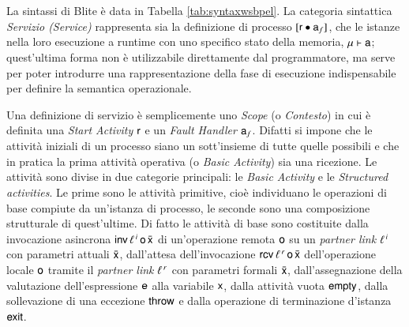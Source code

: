 La sintassi di Blite è data in Tabella \ref{tab:syntaxwsbpel}. La categoria
sintattica \emph{Servizio (Service)} rappresenta  sia la definizione di
processo $[{\sf r} \bullet {\sf a}_f]$, che le istanze nella loro esecuzione a runtime
con uno specifico stato della memoria, ${\sf \mu} \vdash {\sf a}$; quest'ultima
forma non è utilizzabile direttamente dal programmatore, ma serve per poter
introdurre una rappresentazione della fase di esecuzione indispensabile per
definire la semantica operazionale.

Una definizione di servizio è semplicemente uno \emph{Scope} (o
\emph{Contesto}) in cui è definita una
\emph{Start Activity} ${\sf r}$ e un \emph{Fault Handler} ${\sf a}_f$. Difatti si
impone che le attività iniziali di un processo siano un sott'insieme di tutte
quelle possibili e che in pratica la prima attività operativa (o \emph{Basic
Activity}) sia una ricezione. Le attività sono divise in due categorie
principali: le \emph{Basic Activity} e le \emph{Structured activities}. Le
prime sono le attività primitive, cioè individuano le operazioni di
base compiute da un'istanza di processo, le seconde sono una composizione
strutturale di quest'ultime. Di fatto le attività di base sono costituite
dalla invocazione asincrona ${\sf inv}\,\ell^{\,i}\,{\sf o}\,\bar{{\sf x}}$ di un'operazione
remota ${\sf o}$ su un \emph{partner link} $\ell^{\,i}$ con parametri attuali
$\bar{{\sf x}}$, dall'attesa dell'invocazione ${\sf rcv}\,\ell^{\,r}\, {\sf o}\, \bar{{\sf x}}$
dell'operazione locale ${\sf o}$ tramite il \emph{partner link} $\ell^{\,r}$ con
parametri formali ${\bar{{\sf x}}}$, dall'assegnazione della valutazione
dell'espressione ${\sf e}$ alla variabile ${\sf x}$, dalla attività vuota ${\sf empty}$,
dalla sollevazione di una eccezione ${\sf throw}$ e dalla operazione di terminazione
d'istanza ${\sf exit}$.

